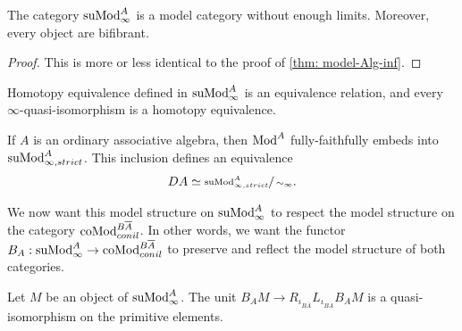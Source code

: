 \documentclass[../thesis.tex]{subfiles}
\begin{document}
            \begin{thm}
                The category $\tt{suMod}_\infty^A$ is a model category without enough limits. Moreover, every object are bifibrant.
            \end{thm}

            \begin{proof}
                This is more or less identical to the proof of \ref{thm: model-Alg-inf}.
            \end{proof}

            \begin{corollary}
                Homotopy equivalence defined in $\tt{suMod}_\infty^A$ is an equivalence relation, and every $\infty$-quasi-isomorphism is a homotopy equivalence.

                If $A$ is an ordinary associative algebra, then $\tt{Mod}^A$ fully-faithfully embeds into $\tt{suMod}_{\infty,strict}^A$. This inclusion defines an equivalence
                \begin{align*}
                    DA \simeq \sfrac{\tt{suMod}^A_{\infty, strict}}{\sim_\infty}\tt{.}
                \end{align*}
            \end{corollary}

            We now want this model structure on $\tt{suMod}^A_\infty$ to respect the model structure on the category $\tt{coMod}_{conil}^{B\overline{A}}$. In other words, we want the functor $B_A : \tt{suMod}_\infty^A \to \tt{coMod}_{conil}^{B\overline{A}}$ to preserve and reflect the model structure of both categories.

            \begin{lemma}
                Let $M$ be an object of $\tt{suMod}_\infty^A$. The unit $B_AM \to R_{\iota_{B\overline{A}}}L_{\iota_{B\overline{A}}}B_AM$ is a quasi-isomorphism on the primitive elements.
            \end{lemma}
\end{document}
